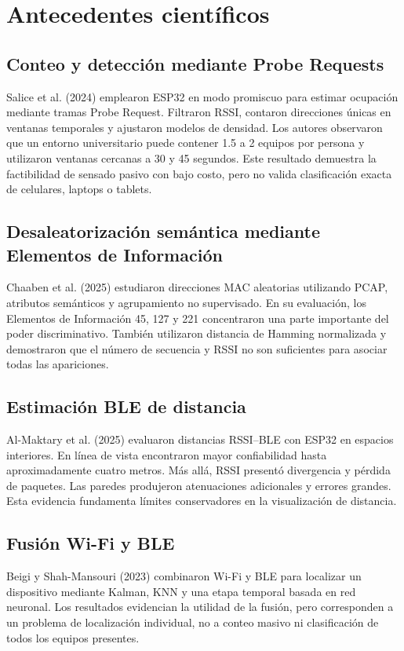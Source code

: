 \documentclass[12pt,a4paper]{article}
\begin{document}
\section{Antecedentes científicos}
\subsection{Conteo y detección mediante Probe Requests}
Salice et al. (2024) emplearon ESP32 en modo promiscuo para estimar ocupación mediante tramas Probe Request. Filtraron RSSI, contaron direcciones únicas en ventanas temporales y ajustaron modelos de densidad. Los autores observaron que un entorno universitario puede contener 1.5 a 2 equipos por persona y utilizaron ventanas cercanas a 30 y 45 segundos. Este resultado demuestra la factibilidad de sensado pasivo con bajo costo, pero no valida clasificación exacta de celulares, laptops o tablets.

\subsection{Desaleatorización semántica mediante Elementos de Información}
Chaaben et al. (2025) estudiaron direcciones MAC aleatorias utilizando PCAP, atributos semánticos y agrupamiento no supervisado. En su evaluación, los Elementos de Información 45, 127 y 221 concentraron una parte importante del poder discriminativo. También utilizaron distancia de Hamming normalizada y demostraron que el número de secuencia y RSSI no son suficientes para asociar todas las apariciones.

\subsection{Estimación BLE de distancia}
Al-Maktary et al. (2025) evaluaron distancias RSSI--BLE con ESP32 en espacios interiores. En línea de vista encontraron mayor confiabilidad hasta aproximadamente cuatro metros. Más allá, RSSI presentó divergencia y pérdida de paquetes. Las paredes produjeron atenuaciones adicionales y errores grandes. Esta evidencia fundamenta límites conservadores en la visualización de distancia.

\subsection{Fusión Wi-Fi y BLE}
Beigi y Shah-Mansouri (2023) combinaron Wi-Fi y BLE para localizar un dispositivo mediante Kalman, KNN y una etapa temporal basada en red neuronal. Los resultados evidencian la utilidad de la fusión, pero corresponden a un problema de localización individual, no a conteo masivo ni clasificación de todos los equipos presentes.
\end{document}
